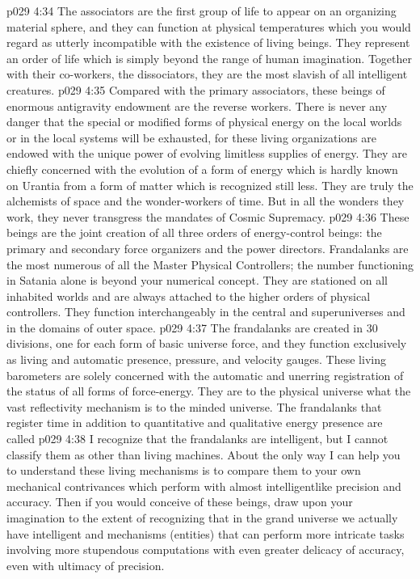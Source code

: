 \vs p029 4:34 The associators are the first group of life to appear on an organizing material sphere, and they can function at physical temperatures which you would regard as utterly incompatible with the existence of living beings. They represent an order of life which is simply beyond the range of human imagination. Together with their co\hyp{}workers, the dissociators, they are the most slavish of all intelligent creatures.
\vs p029 4:35 \bibnobreakspace {} Compared with the primary associators, these beings of enormous antigravity endowment are the reverse workers. There is never any danger that the special or modified forms of physical energy on the local worlds or in the local systems will be exhausted, for these living organizations are endowed with the unique power of evolving limitless supplies of energy. They are chiefly concerned with the evolution of a form of energy which is hardly known on Urantia from a form of matter which is recognized still less. They are truly the alchemists of space and the wonder\hyp{}workers of time. But in all the wonders they work, they never transgress the mandates of Cosmic Supremacy.
\vs p029 4:36 \bibnobreakspace {} These beings are the joint creation of all three orders of energy\hyp{}control beings: the primary and secondary force organizers and the power directors. Frandalanks are the most numerous of all the Master Physical Controllers; the number functioning in Satania alone is beyond your numerical concept. They are stationed on all inhabited worlds and are always attached to the higher orders of physical controllers. They function interchangeably in the central and superuniverses and in the domains of outer space.
\vs p029 4:37 The frandalanks are created in 30 divisions, one for each form of basic universe force, and they function exclusively as living and automatic presence, pressure, and velocity gauges. These living barometers are solely concerned with the automatic and unerring registration of the status of all forms of force\hyp{}energy. They are to the physical universe what the vast reflectivity mechanism is to the minded universe. The frandalanks that register time in addition to quantitative and qualitative energy presence are called 
\vs p029 4:38 I recognize that the frandalanks are intelligent, but I cannot classify them as other than living machines. About the only way I can help you to understand these living mechanisms is to compare them to your own mechanical contrivances which perform with almost intelligentlike precision and accuracy. Then if you would conceive of these beings, draw upon your imagination to the extent of recognizing that in the grand universe we actually have intelligent and  mechanisms (entities) that can perform more intricate tasks involving more stupendous computations with even greater delicacy of accuracy, even with ultimacy of precision.
